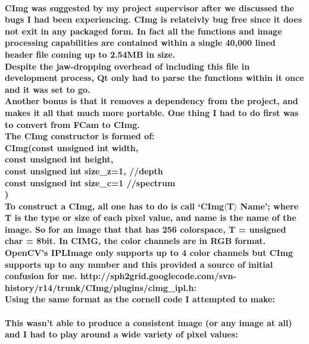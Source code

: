 \documentclass[11pt]{article} %
\newcommand{\tab}{\hspace*{2em}}
\begin{document}
\paragraph{CImg was suggested by my project supervisor after we discussed the bugs I had been experiencing. CImg is relateivly bug free since it does not exit in any packaged form. In fact all the functions and image processing capabilities are contained within a single 40,000 lined header file coming up to 2.54MB in size. \\Despite the jaw-dropping overhead of including this file in development process, Qt only had to parse the functions within it once and it was set to go.
\\Another bonus is that it removes a dependency from the project, and makes it all that much more portable. One thing I had to do first was to convert from FCam to CImg.
\\The CImg constructor is formed of:\\
CImg(const unsigned int width,\\
\tab const unsigned int height,\\
\tab const unsigned int size\_z=1, //depth\\
\tab const unsigned int size\_c=1 //spectrum\\
)\\
To construct a CImg, all one has to do is call ‘CImg\(\langle\)T\(\rangle\) Name’; where T is the type or size of each pixel value, and name is the name of the image. So for an image that that has 256 colorspace, T = unsigned char = 8bit.
In CIMG, the color channels are in RGB format. OpenCV's IPLImage only supports up to 4 color channels but CImg supports up to any number and this provided a source of initial confusion for me.
http://sph2grid.googlecode.com/svn-history/r14/trunk/CImg/plugins/cimg\_ipl.h:\\
Using the same format as the cornell code I attempted to make:}
\begin{frame}[fragile]

\end{frame}
\paragraph{This wasn't able to produce a consistent image (or any image at all) and I had to play around a wide variety of pixel values:}
\begin{frame}[fragile]

\end{frame}
\end{document}
